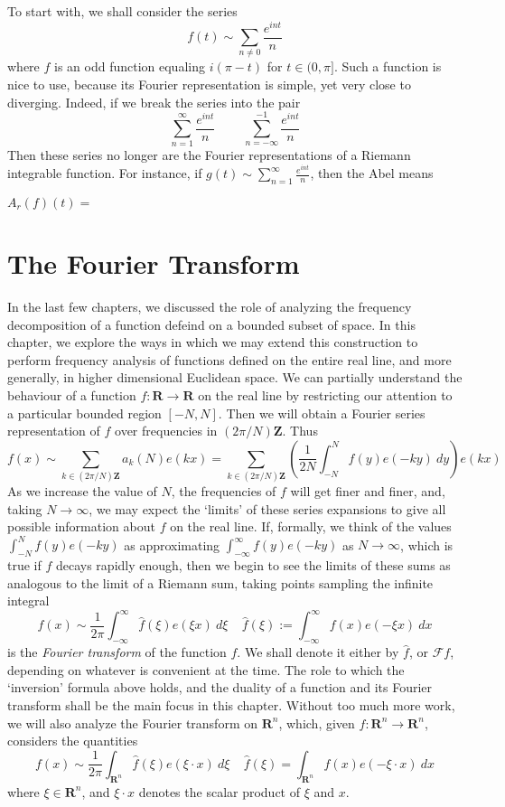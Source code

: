 To start with, we shall consider the series
%
\[ f(t) \sim \sum_{n \neq 0} \frac{e^{int}}{n} \]
%
where $f$ is an odd function equaling $i(\pi - t)$ for $t \in (0,\pi]$. Such a function is nice to use, because its Fourier representation is simple, yet very close to diverging. Indeed, if we break the series into the pair
%
\[ \sum_{n = 1}^\infty  \frac{e^{int}}{n}\ \ \ \ \ \ \ \ \ \ \sum_{n = -\infty}^{-1} \frac{e^{int}}{n} \]
%
Then these series no longer are the Fourier representations of a Riemann integrable function. For instance, if $g(t) \sim \sum_{n = 1}^\infty \frac{e^{int}}{n}$, then the Abel means

$A_r(f)(t) = $


\chapter{The Fourier Transform}

In the last few chapters, we discussed the role of analyzing the frequency decomposition of a function defeind on a bounded subset of space. In this chapter, we explore the ways in which we may extend this construction to perform frequency analysis of functions defined on the entire real line, and more generally, in higher dimensional Euclidean space. We can partially understand the behaviour of a function $f: \mathbf{R} \to \mathbf{R}$ on the real line by restricting our attention to a particular bounded region $[-N,N]$. Then we will obtain a Fourier series representation of $f$ over frequencies in $(2 \pi / N) \mathbf{Z}$. Thus
%
\[ f(x) \sim \sum_{k \in (2 \pi / N) \mathbf{Z}} a_k(N) e(kx) = \sum_{k \in (2 \pi / N) \mathbf{Z}} \left( \frac{1}{2N} \int_{-N}^N f(y) e(-ky)\ dy \right) e(kx) \]
%
As we increase the value of $N$, the frequencies of $f$ will get finer and finer, and, taking $N \to \infty$, we may expect the `limits' of these series expansions to give all possible information about $f$ on the real line. If, formally, we think of the values $\int_{-N}^N f(y) e(-ky)$ as approximating $\int_{-\infty}^\infty f(y) e(-ky)$ as $N \to \infty$, which is true if $f$ decays rapidly enough, then we begin to see the limits of these sums as analogous to the limit of a Riemann sum, taking points sampling the infinite integral
%
\[ f(x) \sim \frac{1}{2 \pi} \int_{-\infty}^\infty \widehat{f}(\xi) e(\xi x)\ d\xi\ \ \ \ \ \widehat{f}(\xi) := \int_{-\infty}^\infty f(x) e(- \xi x)\ dx \]
%
is the {\it Fourier transform} of the function $f$. We shall denote it either by $\widehat{f}$, or $\mathcal{F} f$, depending on whatever is convenient at the time. The role to which the `inversion' formula above holds, and the duality of a function and its Fourier transform shall be the main focus in this chapter. Without too much more work, we will also analyze the Fourier transform on $\mathbf{R}^n$, which, given $f: \mathbf{R}^n \to \mathbf{R}^n$, considers the quantities
%
\[ f(x) \sim \frac{1}{2\pi} \int_{\mathbf{R}^n} \widehat{f}(\xi) e(\xi \cdot x)\ d\xi\ \ \ \ \ \widehat{f}(\xi) = \int_{\mathbf{R}^n} f(x) e(- \xi \cdot x)\ dx \]
%
where $\xi \in \mathbf{R}^n$, and $\xi \cdot x$ denotes the scalar product of $\xi$ and $x$.

